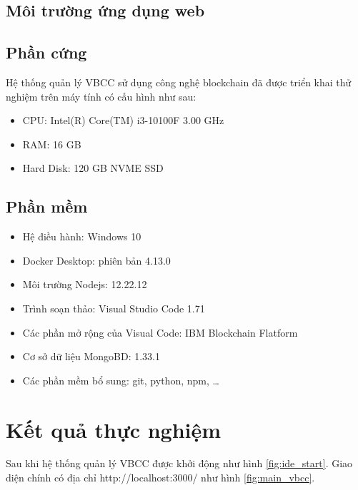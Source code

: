 \subsection{Môi trường ứng dụng web}

\subsection{Phần cứng}

Hệ thống quản lý VBCC sử dụng công nghệ blockchain đã được triển khai thử nghiệm trên máy tính có cấu hình như sau:
\begin{itemize}
\item CPU: Intel(R) Core(TM) i3-10100F 3.00 GHz
\item RAM: 16 GB
\item Hard Disk: 120 GB NVME SSD
\end{itemize}

\subsection{Phần mềm}
\begin{itemize}
\item Hệ điều hành: Windows 10
\item Docker Desktop: phiên bản 4.13.0
\item Môi trường Nodejs: 12.22.12
\item Trình soạn thảo: Visual Studio Code 1.71
\item Các phần mở rộng của Visual Code: IBM Blockchain Flatform
\item Cơ sở dữ liệu MongoBD: 1.33.1
\item Các phần mềm bổ sung: git, python, npm, \ldots
\end{itemize}

\section{Kết quả thực nghiệm}

Sau khi hệ thống quản lý VBCC được khởi động như hình \ref{fig:ide_start}. Giao diện chính có địa chỉ http://localhost:3000/ như hình \ref{fig:main_vbcc}. 

